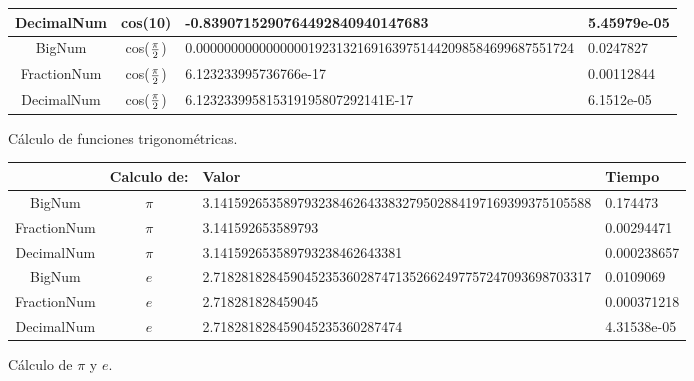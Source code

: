 \documentclass[a4paper,10pt,twocolumn]{article}
\begin{document}
\begin{figure}[h!]
\begin{center}
\begin{tabular}{|c|c|l|l|}
DecimalNum  	& cos(10) 
			& -0.8390715290764492840940147683                            			& 5.45979e-05  
			\\ \hline
			
	BigNum  	& cos($\pi\over 2$)  										
			& 0.000000000000000019231321691639751442098584699687551724  
			& 0.0247827   
			\\ \hline
			
FractionNum 	& cos($\pi\over 2$)
			& 6.123233995736766e-17                                     			& 0.00112844  
			\\ \hline
			
DecimalNum  	& cos($\pi\over 2$)
			& 6.123233995815319195807292141E-17                         			& 6.1512e-05  
			\\ \hline
			
\end{tabular}
		\caption{Cálculo de funciones trigonométricas. \label{fig:ex}}
		\end{center}
	\end{figure}
	
	
	\begin{figure}[h!]%
		\begin{center}
			\begin{tabular}{|c|c|l|l|} \hline
			
			&Calculo de:
			& Valor 	    
			& Tiempo	
			\\ \hline
			
	BigNum  	& $\pi$
			& 3.141592653589793238462643383279502884197169399375105588  			& 0.174473     
			\\ \hline
			
FractionNum 	& $\pi$
			& 3.141592653589793                                         			& 0.00294471   
			\\ \hline
			
DecimalNum  	& $\pi$ 
			& 3.141592653589793238462643381                             			& 0.000238657  
			\\ \hline
			
	BigNum  	& $e$
			& 2.718281828459045235360287471352662497757247093698703317  			& 0.0109069    
			\\ \hline
			
FractionNum 	& $e$
			& 2.718281828459045                                         			& 0.000371218  
			\\ \hline
			
DecimalNum  	& $e$
			& 2.718281828459045235360287474                             			& 4.31538e-05  
			\\ \hline

\end{tabular}
		\caption{Cálculo de $\pi$ y $e$. \label{fig:ex}}
		\end{center}
	\end{figure}
	
\end{document}
